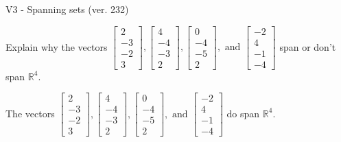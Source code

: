 \begin{exercise}
  \begin{exerciseTitle}V3 - Spanning sets (ver. 232)\end{exerciseTitle}
  \begin{exerciseStatement}
    Explain why the vectors \(\left[\begin{array}{r}
2 \\
-3 \\
-2 \\
3
\end{array}\right] , \left[\begin{array}{r}
4 \\
-4 \\
-3 \\
2
\end{array}\right] , \left[\begin{array}{r}
0 \\
-4 \\
-5 \\
2
\end{array}\right] , \text{ and } \left[\begin{array}{r}
-2 \\
4 \\
-1 \\
-4
\end{array}\right]\) span or don't span \(\mathbb{R}^4\). 
	


  \end{exerciseStatement}
  \begin{exerciseAnswer}
   The vectors \(\left[\begin{array}{r}
2 \\
-3 \\
-2 \\
3
\end{array}\right] , \left[\begin{array}{r}
4 \\
-4 \\
-3 \\
2
\end{array}\right] , \left[\begin{array}{r}
0 \\
-4 \\
-5 \\
2
\end{array}\right] , \text{ and } \left[\begin{array}{r}
-2 \\
4 \\
-1 \\
-4
\end{array}\right]\) 
  	 do  
	span \(\mathbb{R}^4\).
  


  \end{exerciseAnswer}
\end{exercise}